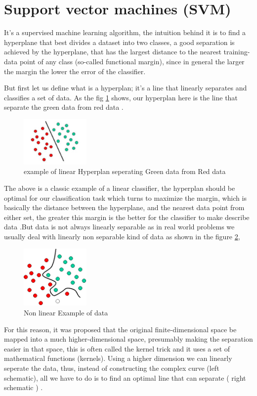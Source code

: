 \section{Support vector machines (SVM) }\label{sec:svm}
It's a supervised machine learning algorithm, the intuition  behind it  is to find a hyperplane that best divides a dataset into two classes, a good separation is achieved by the hyperplane, that has the largest distance to the nearest training-data point of any class (so-called functional margin), since in general the larger the margin the lower the  error of the classifier.

But first let us define what is a hyperplan;  it's a line that  linearly separates and classifies a set of data. As the fig \ref{122} shows, our hyperplan here is the line that separate the green data from red data .

\begin{figure}[H]
\centering
\includegraphics[width=0.3\textwidth]{img/svm1.png}
\caption{example of linear Hyperplan seperating Green data from Red data }
\label{122}
\end{figure}


The above is a classic example of a linear classifier, the hyperplan should be optimal for our classification task which turns to maximize the margin, which is basically the distance between the hyperplane,  and the nearest data point from either set,  the greater this margin is the better for the classifier to make  describe data .But data is not always linearly separable as in real world problems we usually deal with linearly non separable kind of data as shown  in the figure \ref{123 }, 

\begin{figure}[H]
\centering
\includegraphics[width=0.3\textwidth]{img/svm2.png}
\caption{Non linear Example of data  }
\label{123 }
\end{figure}
For this reason, it was proposed that the original finite-dimensional space be mapped into a much higher-dimensional space, presumably making the separation easier in that space, this is often called the kernel trick and it uses a set of mathematical functions (kernels). Using a higher dimension we can  linearly  seperate the data, thus, instead of constructing the complex curve (left schematic), all we have to do is to find an optimal line that can separate ( right schematic ) .




